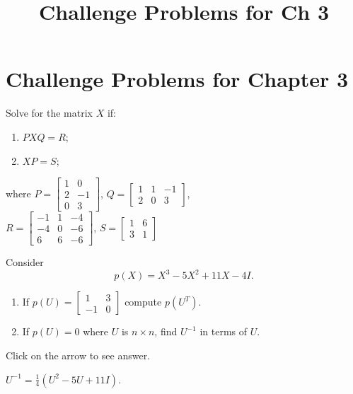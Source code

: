 \documentclass{ximera}
\title{Challenge Problems for Ch 3} \license{CC BY-NC-SA 4.0}
\begin{document}
\begin{abstract}
\end{abstract}
\maketitle

\section*{Challenge Problems for Chapter 3}

\begin{problem}\label{prob:4.75}
Solve for the matrix $X$ if:
\begin{enumerate}
\item $PXQ = R$;
\item $XP = S$;
\end{enumerate}
where
$
P = \left[ \begin{array}{rr}
1 & 0 \\
2 & -1 \\
0 & 3
\end{array} \right]$, $
Q = \left[ \begin{array}{rrr}
1 & 1 & -1 \\
2 & 0 & 3
\end{array} \right]$, \\ $
R = \left[ \begin{array}{rrr}
-1 & 1 & -4 \\
-4 & 0 & -6 \\
6 & 6 & -6
\end{array} \right]$, $
S = \left[ \begin{array}{rr}
1 & 6\\
3 & 1
\end{array} \right]$
\end{problem}

\begin{problem}\label{prob:4.76}
Consider \begin{equation*}
p(X) = X^{3} - 5X^{2} + 11X - 4I.
\end{equation*}

\begin{enumerate}
\item If $p(U) = \left[ \begin{array}{rr}
1 & 3 \\
-1 & 0
\end{array} \right]$
 compute $p(U^{T})$.

\item If $p(U) = 0$ where $U$ is $n \times n$, find $U^{-1}$ in terms of $U$.
\end{enumerate}

Click on the arrow to see answer.
\begin{expandable}
 $U^{-1} = \frac{1}{4}(U^{2} - 5U + 11I)$.
\end{expandable}
\end{problem}
\end{document}
